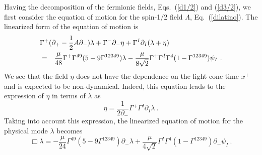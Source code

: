 \documentclass[a4paper,12pt]{article}
\numberwithin{equation}{section}
\begin{document}
Having the decomposition of the fermionic fields, Eqs.~(\ref{d1/2})
and (\ref{d3/2}), we first consider the equation of motion for the
spin-1/2 field $\Lambda$, Eq.~(\ref{dilatino}).  The linearized
form of the equation of motion is
\begin{eqnarray}
\lefteqn{ \Gamma^+ ( \partial_+ - \frac{1}{2} A \partial_- ) \lambda
       + \Gamma^- \partial_- \eta
       + \Gamma^I \partial_I (\lambda + \eta) }
    \nonumber \\
 &=& \frac{\mu}{48} \Gamma^+ \Gamma^{49} (5 - 9 \Gamma^{12349} ) \lambda
     - \frac{\mu}{8 \sqrt{2}} \Gamma^+ \Gamma^I \Gamma^4
       ( 1 - \Gamma^{12349} ) \psi_I ~.
\end{eqnarray}
We see that the field $\eta$ does not have the dependence on the
light-cone time $x^+$ and is expected to be non-dynamical.  Indeed,
this equation leads to the expression of $\eta$ in terms of $\lambda$
as
\begin{equation}
\eta = \frac{1}{2 \partial_-} \Gamma^+ \Gamma^I \partial_I \lambda ~.
\end{equation}
Taking into account this expression, the linearized equation of motion
for the physical mode $\lambda$ becomes
\begin{equation}
\Box \lambda =
- \frac{\mu}{24} \Gamma^{49} ( 5 - 9 \Gamma^{12349} )
       \partial_- \lambda
+ \frac{\mu}{4 \sqrt{2}} \Gamma^I \Gamma^4
     ( 1 - \Gamma^{12349} ) \partial_- \psi_I ~.
\label{dil-eq}
\end{equation}
\end{document}
